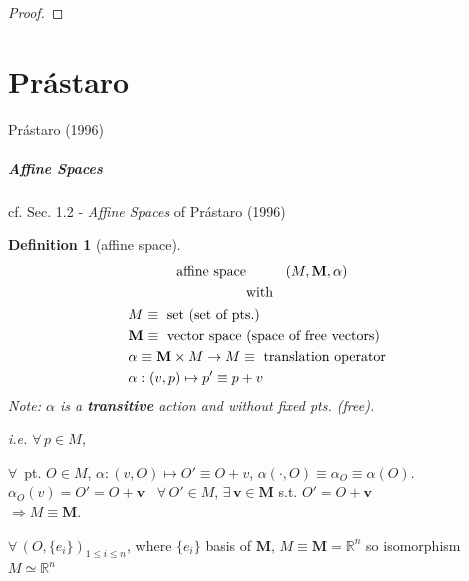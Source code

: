\documentclass[10pt]{amsart}
\newtheorem{definition}{Definition}
\begin{document}
\begin{multicols*}{2}
\begin{proof}
	
\end{proof}

\part{Pr\'{a}staro}

Pr\'{a}staro (1996) \cite{Pras1996}

\subsubsection{Affine Spaces}

cf. Sec. 1.2 - \emph{Affine Spaces} of Pr\'{a}staro (1996) \cite{Pras1996}

\begin{definition}[affine space]
  \begin{equation}
\begin{gathered}
    \text{ affine space \qquad \, } (M, \mathbf{M}, \alpha )  \\
    \text{ with } \\
    \begin{aligned}
      & M \equiv \text{ set (set of pts.) }  \\ 
      & \mathbf{M} \equiv \text{ vector space (space of free vectors) } \\
      & \alpha \equiv \mathbf{M} \times M \to M \equiv \text{ translation operator } \\
      & \alpha : (v,p ) \mapsto p' \equiv p + v
      \end{aligned}
\end{gathered}
  \end{equation}
  Note: $\alpha$ is a \textbf{transitive} action and without fixed pts. (free).

  i.e. $\forall \, p \in M$, 
  \end{definition}

$\forall \, $ pt. $O \in M$, $\alpha:(v,O) \mapsto O' \equiv O + v$, $\alpha (\cdot , O) \equiv \alpha_O \equiv \alpha(O)$.  $\alpha_O(v) = O' = O + \mathbf{v}$ \qquad \, $\forall \, O' \in M$, $\exists \, \mathbf{v} \in \mathbf{M}$ s.t. $O' = O + \mathbf{v}$ \\
$\Longrightarrow M \equiv \mathbf{M}$.

$\forall \, (O, \lbrace e_i \rbrace)_{1 \leq i \leq n }$, where $\lbrace e_i \rbrace$ basis of $\mathbf{M}$, $M \equiv \mathbf{M} = \mathbb{R}^n$ so isomorphism $M \simeq \mathbb{R}^n$ \\


\end{multicols*}
\end{document}
